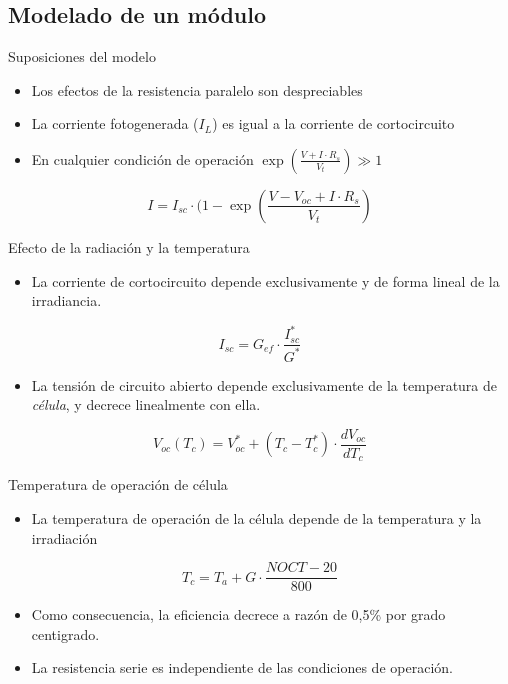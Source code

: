 \documentclass[xcolor={usenames,svgnames,dvipsnames}]{beamer}
\begin{document}
\subsection{Modelado de un módulo}
\label{sec:org07aaab1}

\begin{frame}[label={sec:orgb59f72b}]{Suposiciones del modelo}
\begin{itemize}[<+->]
\item Los efectos de la resistencia paralelo son despreciables

\item La corriente fotogenerada (\(I_{L}\)) es igual a la corriente de cortocircuito

\item En cualquier condición de operación \(\exp(\frac{V+I\cdot R_{s}}{V_{t}})\gg1\)
\end{itemize}

\[
I=I_{sc}\cdot(1-\exp(\frac{V-V_{oc}+I\cdot R_{s}}{V_{t}})
\]
\end{frame}

\begin{frame}[label={sec:org5f7430d}]{Efecto de la radiación y la temperatura}
\begin{itemize}[<+->]
\item La \alert{corriente de cortocircuito} depende exclusivamente y de forma lineal de la \alert{irradiancia}.
\end{itemize}
\[
I_{sc}=G_{ef}\cdot\frac{I_{sc}^{*}}{G^{*}}
\]

\begin{itemize}
\item La \alert{tensión de circuito abierto} depende exclusivamente de la \alert{temperatura de \emph{célula}}, y decrece linealmente con ella.
\end{itemize}
\[
V_{oc}(T_{c})=V_{oc}^{*}+(T_{c}-T_{c}^{*})\cdot\frac{dV_{oc}}{dT_{c}}
\]
\end{frame}

\begin{frame}[label={sec:org1dde6dc}]{Temperatura de operación de célula}
\begin{itemize}
\item La \alert{temperatura de operación de la célula} depende de la \alert{temperatura y la irradiación}
\end{itemize}
$$T_{c}=T_{a}+G\cdot\frac{NOCT-20}{800}$$

\begin{itemize}
\item Como consecuencia, la \alert{eficiencia decrece} a razón de 0,5\% por grado centigrado.

\item La \alert{resistencia serie} es \alert{independiente} de las condiciones de operación.
\end{itemize}
\end{frame}
\end{document}
